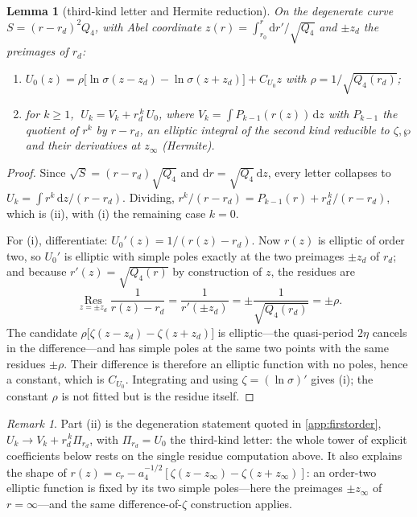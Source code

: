 \documentclass[12pt]{iopart}
\newcommand{\dd}{\mathrm{d}}
\theoremstyle{plain}
\theoremstyle{definition}
\theoremstyle{plain}
\newtheorem{auxlemma}{Lemma}
\theoremstyle{remark}
\newtheorem*{remark}{Remark}
\begin{document}
\begin{auxlemma}[third-kind letter and Hermite reduction]\label{lem:U0}
On the degenerate curve $S=(r-r_d)^2Q_4$, with Abel coordinate
$z(r)=\int_{r_0}^r\dd r'/\sqrt{Q_4}$ and $\pm z_d$ the preimages of $r_d$:
\begin{enumerate}
\item[(i)] $\displaystyle U_0(z)=\rho\big[\ln\sigma(z-z_d)-\ln\sigma(z+z_d)\big]+C_{U_0}z$
with $\rho=1/\sqrt{Q_4(r_d)}$;
\item[(ii)] for $k\ge1$, $\;U_k=V_k+r_d^{\,k}\,U_0$, where
$V_k=\int P_{k-1}(r(z))\,\dd z$ with $P_{k-1}$ the quotient of $r^k$ by $r-r_d$, an
elliptic integral of the second kind reducible to $\zeta,\wp$ and their derivatives at
$z_\infty$ (Hermite).
\end{enumerate}
\end{auxlemma}

\begin{proof}
Since $\sqrt S=(r-r_d)\sqrt{Q_4}$ and $\dd r=\sqrt{Q_4}\,\dd z$, every letter collapses to
$U_k=\int r^k\,\dd z/(r-r_d)$. Dividing, $r^k/(r-r_d)=P_{k-1}(r)+r_d^{\,k}/(r-r_d)$, which
is (ii), with (i) the remaining case $k=0$.

For (i), differentiate: $U_0'(z)=1/(r(z)-r_d)$. Now $r(z)$ is elliptic of order two, so
$U_0'$ is elliptic with simple poles exactly at the two preimages $\pm z_d$ of $r_d$; and
because $r'(z)=\sqrt{Q_4(r)}$ by construction of $z$, the residues are
\[
   \operatorname*{Res}_{z=\pm z_d}\frac{1}{r(z)-r_d}=\frac{1}{r'(\pm z_d)}
   =\pm\frac{1}{\sqrt{Q_4(r_d)}}=\pm\rho .
\]
The candidate $\rho\big[\zeta(z-z_d)-\zeta(z+z_d)\big]$ is elliptic---the quasi-period
$2\eta$ cancels in the difference---and has simple poles at the same two points with the
same residues $\pm\rho$. Their difference is therefore an elliptic function with no poles,
hence a constant, which is $C_{U_0}$. Integrating and using $\zeta=(\ln\sigma)'$ gives
(i); the constant $\rho$ is not fitted but is the residue itself.
\end{proof}

\begin{remark}
Part (ii) is the degeneration statement quoted in \ref{app:firstorder}, $U_k\to V_k+
r_d^{\,k}\Pi_{r_d}$, with $\Pi_{r_d}=U_0$ the third-kind letter: the whole tower of
explicit coefficients below rests on the single residue computation above. It also
explains the shape of $r(z)=c_r-a_4^{-1/2}[\zeta(z-z_\infty)-\zeta(z+z_\infty)]$: an
order-two elliptic function is fixed by its two simple poles---here the preimages
$\pm z_\infty$ of $r=\infty$---and the same difference-of-$\zeta$ construction applies.
\end{remark}
\end{document}
